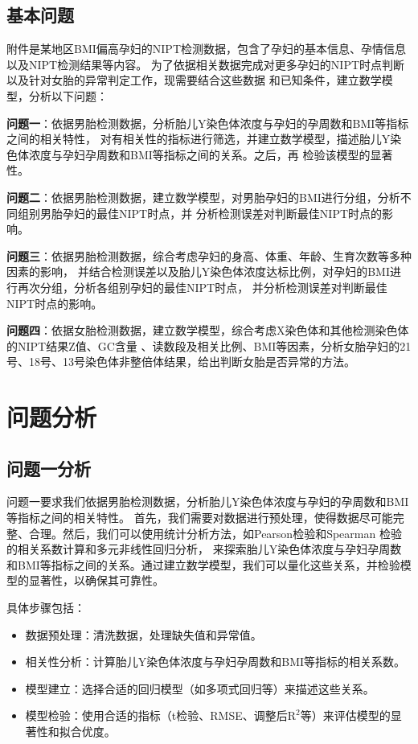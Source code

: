 \documentclass{cumcmthesis}
\begin{document}
        \subsection{基本问题}
        附件是某地区BMI偏高孕妇的NIPT检测数据，包含了孕妇的基本信息、孕情信息以及NIPT检测结果等内容。
        为了依据相关数据完成对更多孕妇的NIPT时点判断以及针对女胎的异常判定工作，现需要结合这些数据
        和已知条件，建立数学模型，分析以下问题：
        \par 
        \textbf{问题一}：依据男胎检测数据，分析胎儿Y染色体浓度与孕妇的孕周数和BMI等指标之间的相关特性，
        对有相关性的指标进行筛选，并建立数学模型，描述胎儿Y染色体浓度与孕妇孕周数和BMI等指标之间的关系。之后，再
        检验该模型的显著性。
        \par
        \textbf{问题二}：依据男胎检测数据，建立数学模型，对男胎孕妇的BMI进行分组，分析不同组别男胎孕妇的最佳NIPT时点，并
        分析检测误差对判断最佳NIPT时点的影响。
        \par
        \textbf{问题三}：依据男胎检测数据，综合考虑孕妇的身高、体重、年龄、生育次数等多种因素的影响，
        并结合检测误差以及胎儿Y染色体浓度达标比例，对孕妇的BMI进行再次分组，分析各组别孕妇的最佳NIPT时点，
        并分析检测误差对判断最佳NIPT时点的影响。
        \par
        \textbf{问题四}：依据女胎检测数据，建立数学模型，综合考虑X染色体和其他检测染色体的NIPT结果Z值、GC含量
        、读数段及相关比例、BMI等因素，分析女胎孕妇的21号、18号、13号染色体非整倍体结果，给出判断女胎是否异常的方法。
        \section{问题分析}
        \subsection{问题一分析}
        问题一要求我们依据男胎检测数据，分析胎儿Y染色体浓度与孕妇的孕周数和BMI等指标之间的相关特性。
        首先，我们需要对数据进行预处理，使得数据尽可能完整、合理。然后，我们可以使用统计分析方法，如Pearson检验和Spearman
        检验的相关系数计算和多元非线性回归分析，
        来探索胎儿Y染色体浓度与孕妇孕周数和BMI等指标之间的关系。通过建立数学模型，我们可以量化这些关系，并检验模型的显著性，以确保其可靠性。
        \par 具体步骤包括：
        \begin{itemize} 
            \item 数据预处理：清洗数据，处理缺失值和异常值。
            \item 相关性分析：计算胎儿Y染色体浓度与孕妇孕周数和BMI等指标的相关系数。
            \item 模型建立：选择合适的回归模型（如多项式回归等）来描述这些关系。
            \item 模型检验：使用合适的指标（t检验、RMSE、调整后$\text{R}^2$等）来评估模型的显著性和拟合优度。
        \end{itemize}
\end{document}
